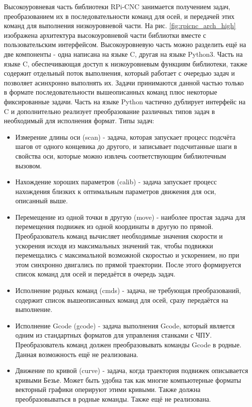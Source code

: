 \documentclass[14pt,russian,a4paper]{extarticle}
\begin{document}
Высокоуровневая часть библиотеки RPi-CNC занимается получением задач, преобразованием их в последовательности команд для осей, и передачей этих команд для выполнения низкоуровневой части. На рис. \ref{fig:rpicnc_arch_high} изображена архитектура высокоуровневой части библиотки вместе с пользовательским интерфейсом. Высокоуровневую часть можно разделить ещё на две компоненты - одна написана на языке C, другая на языке Python3. Часть на языке C, обеспечивающая доступ к низкоуровневым функциям библиотеки, также содержит отдельный поток выполнения, который работает с очередью задач и позволяет асинхронно выполнять их. Задачи принимаются данной частью только в формате последовательности вышеописанных команд плюс некоторые фиксированные задачи. Часть на языке Python частично дублирует интерфейс на C и дополнительно реализует преобразование различных типов задач в необходимый для исполнения формат. Типы задач:
\begin{itemize}
    \item Измерение длины оси (scan) - задача, которая запускает процесс подсчёта шагов от одного концевика до другого, и записывает подсчитанные шаги в свойства оси, которые можно извлечь соответствующим библиотечным вызовом.
    \item Нахождение хороших параметров (calib) - задача запускает процесс нахождения близких к оптимальным параметров движения для оси, описанный выше.
    \item Перемещение из одной точки в другую (move) - наиболее простая задача для перемещения подвижек из одной координаты в другую по прямой. Преобразователь команд вычисляет необходимые значения скорости и ускорения исходя из максимальных значений так, чтобы подвижки перемещались с максимальной возможной скоростью и ускорением, но при этом синхронно двигались по прямой траектории. После этого формируется список команд для осей и передаётся в очередь задач.
    \item Исполнение родных команд (cmds) - задача, не требующая преобразований, содержит список вышеописанных команд для осей, сразу передаётся на выполнение.
    \item Исполнение Gcode (gcode) - задача выполнения Gcode, который является одним из стандартных форматов для управления станками с ЧПУ. Преобразователь команд должен преобразовывать команды Gcode в родные. Данная возможность ещё не реализована.
    \item Движение по кривой (curve) - задача, когда траектория подвижек описывается кривыми Безье. Может быть удобна так как многие компьютерные форматы векторный графики оперируют этими кривыми. Также должна преобразовываться в родные команды. Также ещё не реализована.
\end{itemize}
\end{document}
